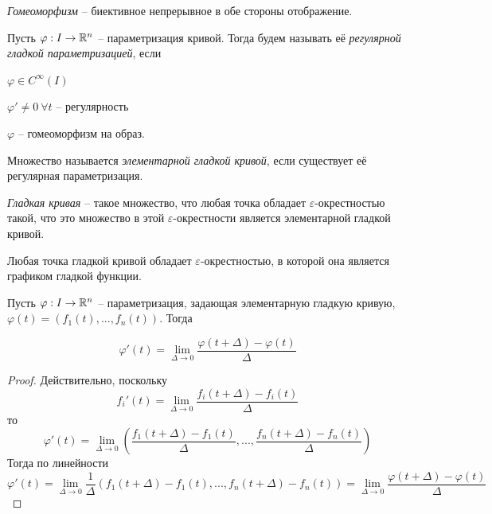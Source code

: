 
\begin{Def}[Гомеоморфизм]
	\textit{Гомеоморфизм} -- биективное непрерывное в обе стороны отображение.
\end{Def}

\begin{Def}
	Пусть $\varphi : I \to \mathbb{R}^n$ -- параметризация кривой. Тогда будем называть её \textit{регулярной гладкой параметризацией}, если
	\begin{MyList}
		\item $\varphi \in C^\infty (I)$ 
		\item $\varphi' \neq 0 \ \forall t$ -- регулярность
		\item $\varphi$ -- гомеоморфизм на образ.  
	\end{MyList}
\end{Def}

\begin{Def}
	Множество называется \textit{элементарной гладкой кривой}, если существует её регулярная параметризация.
\end{Def}

\begin{Def}
	\textit{Гладкая кривая} -- такое множество, что любая точка обладает $\varepsilon$-окрестностью такой, что это множество в этой $\varepsilon$-окрестности является элементарной гладкой кривой.
\end{Def}

\begin{Def}
	Любая точка гладкой кривой обладает $\varepsilon$-окрестностью, в которой она является графиком гладкой функции. 
\end{Def}


\begin{Thm}
	Пусть $\varphi : I \to \mathbb{R}^n$ -- параметризация, задающая элементарную гладкую кривую, $\varphi(t) = (f_1(t), ..., f_n(t))$.
	Тогда

	\[\varphi'(t) = \lim_{\Delta \to 0} \frac{\varphi(t + \Delta) - \varphi(t)}{\Delta}\]
\end{Thm}

\begin{proof}
	Действительно, поскольку
	\[f_i'(t) = \lim_{\Delta \to 0} \frac{f_i(t + \Delta) - f_i(t)}{\Delta}\]
	то 
	\[\varphi'(t) = \lim_{\Delta \to 0} \left( \frac{f_1(t + \Delta) - f_1(t)}{\Delta}, ..., \frac{f_n(t + \Delta) - f_n(t)}{\Delta}\right)\]
	Тогда по линейности
	\[\varphi'(t) = \lim_{\Delta \to 0} \frac{1}{\Delta} \left(f_1(t + \Delta) - f_1(t), ..., f_n(t + \Delta) - f_n(t)\right) = \lim_{\Delta \to 0} \frac{\varphi(t + \Delta) - \varphi(t)}{\Delta}\]
\end{proof}

